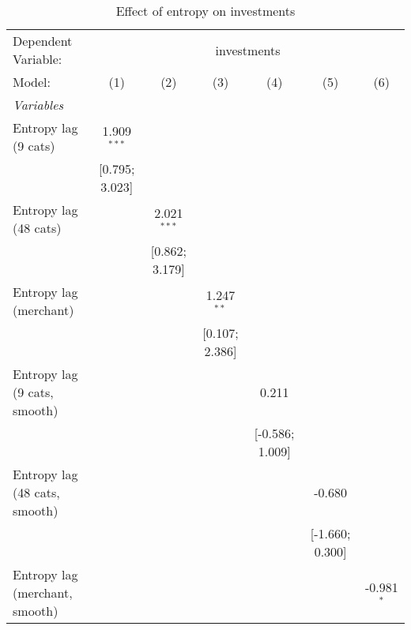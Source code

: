 
\begin{table}[htbp]
   \centering
   \tiny
   \begin{threeparttable}[b]
      \caption{\label{tab:reg_investments_lag_cnz} Effect of entropy on investments}
      \begin{tabular}{lcccccc}
         \tabularnewline \midrule \midrule
         Dependent Variable: & \multicolumn{6}{c}{investments}\\
         Model:                         & (1)             & (2)             & (3)             & (4)             & (5)             & (6)\\  
         \midrule
         \emph{Variables}\\
         Entropy lag (9 cats)           & 1.909$^{***}$   &                 &                 &                 &                 &   \\   
                                        & [0.795; 3.023]  &                 &                 &                 &                 &   \\   
         Entropy lag (48 cats)          &                 & 2.021$^{***}$   &                 &                 &                 &   \\   
                                        &                 & [0.862; 3.179]  &                 &                 &                 &   \\   
         Entropy lag (merchant)         &                 &                 & 1.247$^{**}$    &                 &                 &   \\   
                                        &                 &                 & [0.107; 2.386]  &                 &                 &   \\   
         Entropy lag (9 cats, smooth)   &                 &                 &                 & 0.211           &                 &   \\   
                                        &                 &                 &                 & [-0.586; 1.009] &                 &   \\   
         Entropy lag (48 cats, smooth)  &                 &                 &                 &                 & -0.680          &   \\   
                                        &                 &                 &                 &                 & [-1.660; 0.300] &   \\   
         Entropy lag (merchant, smooth) &                 &                 &                 &                 &                 & -0.981$^{*}$\\   

\end{tabular}
\end{threeparttable}
\end{table}
